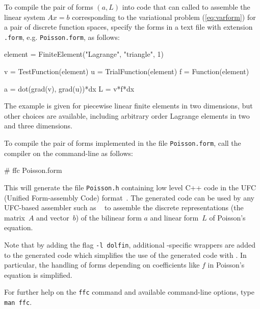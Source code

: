 To compile the pair of forms $(a, L)$ into code that can called to
assemble the linear system $A x = b$ corresponding to the variational
problem (\ref{eq:varform}) for a pair of discrete function spaces,
specify the forms in a text file with extension \texttt{.form},
e.g. \texttt{Poisson.form}, as follows:
\begin{code}
element = FiniteElement("Lagrange", "triangle", 1)

v = TestFunction(element)
u = TrialFunction(element)
f = Function(element)
  
a = dot(grad(v), grad(u))*dx
L = v*f*dx
\end{code}

The example is given for piecewise linear finite elements in two
dimensions, but other choices are available, including arbitrary order
Lagrange elements in two and three dimensions.

To compile the pair of forms implemented in the file
\texttt{Poisson.form}, call the compiler on the command-line as
follows:
\begin{code}
# ffc Poisson.form
\end{code}
This will generate the file \texttt{Poisson.h} containing low level
C++ code in the UFC (Unified Form-assembly Code) format~\cite{www:ufc}.
The generated code can be used by any UFC-based assembler
such as \dolfin{}~\cite{www:dolfin} to assemble the discrete
representations (the matrix~$A$ and vector~$b$) of the bilinear form
$a$ and linear form~$L$ of Poisson's equation.

Note that by adding the flag \texttt{-l dolfin}, additional
\dolfin{}-specific wrappers are added to the generated code which
simplifies the use of the generated code with \dolfin{}. In
particular, the handling of forms depending on coefficients like $f$
in Poisson's equation is simplified.

For further help on the \texttt{ffc} command and available
command-line options, type \texttt{man ffc}.   
